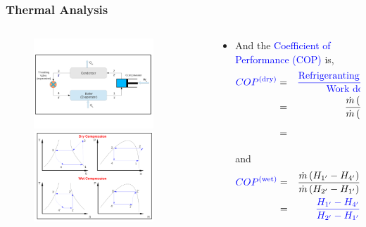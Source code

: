 \documentclass[10pt,compress]{beamer}
\newcommand{\frc}{\displaystyle\frac}
\begin{document}
\begin{frame}
 \frametitle{Thermal Analysis}
 \begin{columns}
  \begin{column}[c]{0.35\linewidth}
   \begin{figure}%
     \vbox{
      \includegraphics[width=4.5cm,clip]{./Pics/Overview_Refrig12}
      \vspace{-.5cm}
    \includegraphics[width=4.5cm,clip]{./Pics/Overview_Refrig13}}
   \end{figure}  
  \end{column}  
  \begin{column}[c]{0.65\linewidth}
   \begin{itemize}
    \item <1-> And the \textcolor{blue}{Coefficient of Performance (COP)} is,
       \begin{eqnarray}
        \textcolor{blue}{COP^{\text{(dry)}}} &=& \textcolor{blue}{\frc{\text{Refrigeranting Capacity}}{\text{Work done}}} \nonumber \\
                       &=& \frc{\dot{m}\left(H_{1}-H_{4}\right)}{\dot{m}\left(H_{2}-H_{1}\right)} \nonumber \\
                       &=& \textcolor{blue}{\frc{H_{1}-H_{4}}{H_{2}-H_{1}}}       \nonumber
       \end{eqnarray}
     and
       \begin{eqnarray}
        \textcolor{blue}{COP^{\text{(wet)}}} &=& \frc{\dot{m}\left(H_{1^{\prime}}-H_{4^{\prime}}\right)}{\dot{m}\left(H_{2^{\prime}}-H_{1^{\prime}}\right)} \nonumber \\
                       &=& \textcolor{blue}{\frc{H_{1^{\prime}}-H_{4^{\prime}}}{H_{2^{\prime}}-H_{1^{\prime}}} }    \nonumber  
       \end{eqnarray}

   \end{itemize}
  \end{column}  
 \end{columns}
\end{frame}
\end{document}
